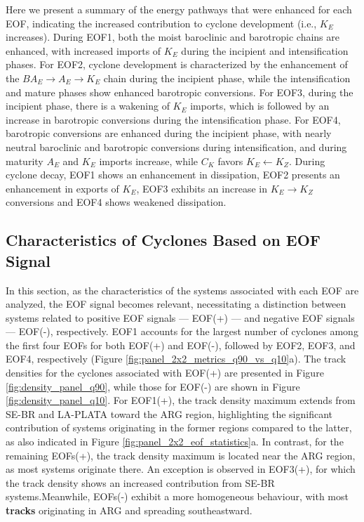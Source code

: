 \documentclass[pdflatex,sn-chicago]{sn-jnl}%
\theoremstyle{plain}
\theoremstyle{definition}
\theoremstyle{remark}
\theoremstyle{definition}
\begin{document}
Here we present a summary of the energy pathways that were enhanced for each EOF, indicating the increased contribution to cyclone development (i.e., $K_E$ increases). During EOF1, both the moist baroclinic and barotropic chains are enhanced, with increased imports of $K_E$ during the incipient and intensification phases. For EOF2, cyclone development is characterized by the enhancement of the $BA_E \rightarrow A_E \rightarrow K_E$ chain during the incipient phase, while the intensification and mature phases show enhanced barotropic conversions. For EOF3, during the incipient phase, there is a wakening of $K_E$ imports, which is followed by an increase in barotropic conversions during the intensification phase. For EOF4, barotropic conversions are enhanced during the incipient phase, with nearly neutral baroclinic and barotropic conversions during intensification, and during maturity $A_E$ and $K_E$ imports increase, while $C_K$ favors $K_E \leftarrow K_Z$. During cyclone decay, EOF1 shows an enhancement in dissipation, EOF2 presents an enhancement in exports of $K_E$, EOF3 exhibits an increase in $K_E \rightarrow K_Z$ conversions and EOF4 shows weakened dissipation.

\subsection{Characteristics of Cyclones Based on EOF Signal}\label{sec:eof_statistics}

In this section, as the characteristics of the systems associated with each EOF are analyzed, the EOF signal becomes relevant, necessitating a distinction between systems related to positive EOF signals — EOF(+) — and negative EOF signals — EOF(-), respectively. EOF1 accounts for the largest number of cyclones among the first four EOFs for both EOF(+) and EOF(-), followed by EOF2, EOF3, and EOF4, respectively (Figure \ref{fig:panel_2x2_metrics_q90_vs_q10}a). 
The track densities for the cyclones associated with EOF(+) are presented in Figure \ref{fig:density_panel_q90}, while those for EOF(-) are shown in Figure \ref{fig:density_panel_q10}. For EOF1(+), the track density maximum extends from SE-BR and LA-PLATA toward the ARG region, highlighting the significant contribution of systems originating in the former regions compared to the latter, as also indicated in Figure \ref{fig:panel_2x2_eof_statistics}a. In contrast, for the remaining EOFs(+), the track density maximum is located near the ARG region, as most systems originate there. An exception is observed in EOF3(+), for which the track density shows an increased contribution from SE-BR systems.Meanwhile, EOFs(-) exhibit a more homogeneous behaviour, with most \textbf{tracks} originating in ARG and spreading southeastward.
\end{document}
